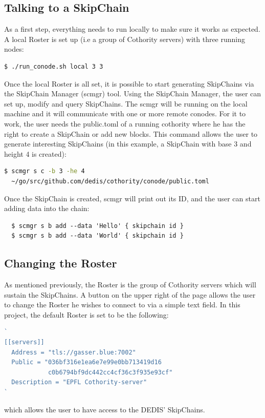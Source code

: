\documentclass[11pt, a4paper, twoside, openright]{article} %
\begin{document}
{\subsection{Talking to a SkipChain}
As a first step, everything needs to run locally to make sure it works as expected. A local Roster is set up (i.e a group of Cothority servers) with three running nodes:
\\
\begin{lstlisting}[language=bash]
  $ ./run_conode.sh local 3 3
\end{lstlisting}
Once the local Roster is all set, it is possible to start generating SkipChains via the SkipChain Manager (scmgr) tool.
Using the SkipChain Manager, the user can set up, modify and query SkipChains. The scmgr will be running on the local machine and it will communicate with one or more remote conodes. For it to work, the user needs the public.toml of a running cothority where he has the right to create a SkipChain or add new blocks.
This command allows the user to generate interesting SkipChains (in this example, a SkipChain with base 3 and height 4 is created):
\begin{lstlisting}[language=bash]
  $ scmgr s c -b 3 -he 4 
  ~/go/src/github.com/dedis/cothority/conode/public.toml
\end{lstlisting}
Once the SkipChain is created, scmgr will print out its ID, and the user can start adding data into the chain:
\begin{lstlisting}
  $ scmgr s b add --data 'Hello' { skipchain id }
  $ scmgr s b add --data 'World' { skipchain id }
\end{lstlisting}
\subsection{Changing the Roster}
As mentioned previously, the Roster is the group of Cothority servers which will sustain the SkipChains. A button on the upper right of the page allows the user to change the Roster he wishes to connect to via a simple text field. In this project, the default Roster is set to be the following:
\begin{lstlisting}[language=JavaScript]
`
[[servers]]
  Address = "tls://gasser.blue:7002"
  Public = "036bf316e1ea6e7e99e0bb713419d16
            c0b6794bf9dc442cc4cf36c3f935e93cf"
  Description = "EPFL Cothority-server"
`
\end{lstlisting}
which allows the user to have access to the DEDIS' SkipChains.
\clearpage
\newpage
}
\end{document}
